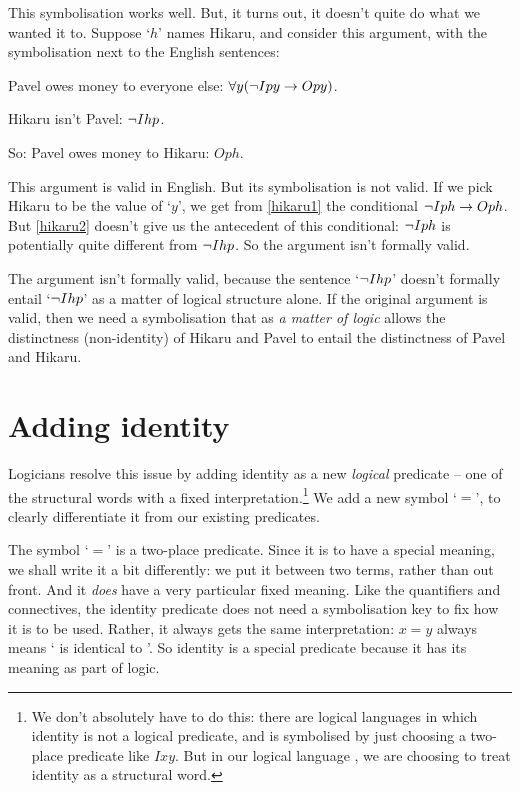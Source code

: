 This symbolisation works well. But, it turns out, it doesn't quite do what we wanted it to. Suppose `$h$' names Hikaru, and consider this argument, with the symbolisation next to the English sentences:
\begin{earg}
	\item[\ex{hikaru1}] Pavel owes money to everyone else: $\forall y (\neg Ipy \rightarrow Opy)$.
	\item[\ex{hikaru2}] Hikaru isn't Pavel: $\neg Ihp$.
	\item[So:] Pavel owes money to Hikaru: $Oph$.
\end{earg}This argument is valid in English. But its symbolisation is not valid. If we pick Hikaru to be the value of `$y$', we get from \ref{hikaru1} the conditional $\neg Iph \rightarrow Oph$. But \ref{hikaru2} doesn't give us the antecedent of this conditional: $\neg Iph$ is potentially quite different from $\neg Ihp$. So the argument isn't formally valid.

The argument isn't formally valid, because the sentence `$\neg Ihp$' doesn't formally entail `$\neg Ihp$' as a matter of logical structure alone. If the original argument is valid, then we need a symbolisation that as \emph{a matter of logic} allows the distinctness (non-identity) of Hikaru and Pavel to entail the distinctness of Pavel and Hikaru.  

\section{Adding identity}

Logicians resolve this issue by adding identity as a new \emph{logical} predicate – one of the structural words with a fixed interpretation.\footnote{We don't absolutely have to do this: there are logical languages in which identity is not a logical predicate, and is symbolised by just choosing a two-place predicate like $Ixy$. But in our logical language \FOL, we are choosing to treat identity as a structural word.} We add a new symbol `$=$', to clearly differentiate it from our existing predicates. 

The symbol `$=$' is a two-place predicate. Since it is to have a special meaning, we shall write it a bit differently: we put it between two terms, rather than out front. And it \emph{does} have a very particular fixed meaning. Like the quantifiers and connectives, the identity predicate does not need a symbolisation key to fix how it is to be used. Rather, it always gets the same interpretation: $x=y$ always means ` is identical to '. So identity is a special predicate because it has its meaning as part of logic.

